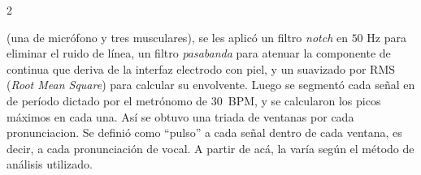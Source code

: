 \documentclass[11pt, letterpaper]{article}
\begin{document}
\begin{multicols*}{2}
            
            
            
    
\noindent (una de micrófono y tres musculares), se les aplicó un filtro \textit{notch} en $50$ Hz para eliminar el ruido de línea, un filtro \textit{pasabanda} para atenuar la componente de continua que deriva de la interfaz electrodo con piel, y un suavizado por RMS (\textit{Root Mean Square}) para calcular su envolvente. Luego se segmentó cada señal en  de período dictado por el metrónomo de 30~BPM, y se calcularon los picos máximos en cada una. Así se obtuvo una triada de ventanas por cada pronunciacion. Se definió como “pulso” a cada señal dentro de cada ventana, es decir, a cada pronunciación de vocal. A partir de acá, la  varía según el método de análisis utilizado.


\end{multicols*}
\end{document}
